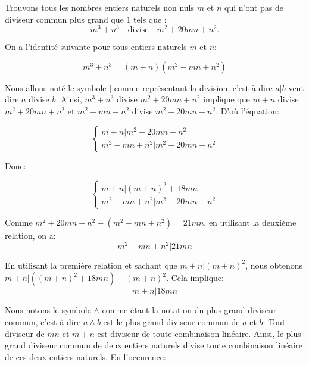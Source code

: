 \documentclass[12pt,a4paper,article]{memoir}
\begin{document}
Trouvons tous les nombres entiers naturels non nuls $m$ et $n$ qui n'ont pas de diviseur commun plus grand que $1$ tels que :
\begin{equation}
m^3 + n^3 \quad \textrm{divise} \quad m^2 + 20mn + n^2.
\label{equation-pb-2-sol-1}
\end{equation}

\bigskip

On a l'identité suivante pour tous entiers naturels $m$ et $n$:

\begin{equation}
m^3 + n^3 = (m+n)(m^2-mn+n^2)
\label{equation-factor-sum-cube}
\end{equation}

Nous allons noté le symbole $|$ comme représentant la division, c'est-à-dire $a|b$ veut dire $a$ divise $b$.
Ainsi, $m^3 + n^3$ divise $m^2+20mn+n^2$ implique que $m+n$ divise $m^2+20mn+n^2$ et $m^2-mn+n^2$ divise $m^2+20mn+n^2$. D'où l'équation:

\[\left\{
	\begin{array}{l}
	m+n | m^2+20mn+n^2 \\
	m^2-mn+n^2 | m^2+20mn+n^2
	\end{array}
\right.\]

Donc:

\[\left\{
	\begin{array}{l}
	m+n | (m+n)^2 + 18mn \\
	m^2-mn+n^2 | m^2+20mn+n^2
	\end{array}
\right.\]


Comme $m^2+20mn+n^2 - (m^2-mn+n^2) = 21mn$, en utilisant la deuxième relation, on a:
\begin{equation}
m^2-mn+n^2 | 21mn
\label{equation-divise-vgtun-prod}
\end{equation}

En utilisant la première relation et sachant que $m + n | (m + n)^2$, nous obtenons $m+n | ((m+n)^2 + 18mn) - (m+n)^2$. Cela implique:
\begin{equation}
m+n | 18mn
\label{equation-divise-sum-prod}
\end{equation}

Nous notons le symbole $\land$ comme étant la notation du plus grand diviseur commun, c'est-à-dire $a \land b$ est le plus grand diviseur commun de $a$ et $b$. Tout diviseur de $mn$ et $m+n$ est diviseur de toute combinaison linéaire. Ainsi, le plus grand diviseur commun de deux entiers naturels divise toute combinaison linéaire de ces deux entiers naturels. En l'occurence:
\end{document}
